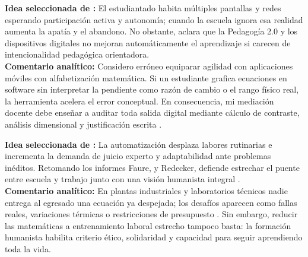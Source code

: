 \documentclass[spanish,letterpaper,oneside]{article}
\begin{document}
\begin{tcolorbox}[colback=iiiepeMint,colframe=iiiepeAqua!80!black,title=\textbf{Idea 2 · Nuevo aprendiz conectado, Pedagogía 2.0 y ciudadanía digital crítica},breakable]
\textbf{Idea seleccionada de \citet{scott2015futuro}:} El estudiantado habita múltiples pantallas y redes esperando participación activa y autonomía; cuando la escuela ignora esa realidad aumenta la apatía y el abandono. No obstante, \citet{scott2015futuro} aclara que la Pedagogía 2.0 y los dispositivos digitales no mejoran automáticamente el aprendizaje si carecen de intencionalidad pedagógica orientadora.\\[4pt]
\textbf{Comentario analítico:} Considero erróneo equiparar agilidad con aplicaciones móviles con alfabetización matemática. Si un estudiante grafica ecuaciones en software sin interpretar la pendiente como razón de cambio o el rango físico real, la herramienta acelera el error conceptual. En consecuencia, mi mediación docente debe enseñar a auditar toda salida digital mediante cálculo de contraste, análisis dimensional y justificación escrita \citep{sep2023pensamiento}.
\end{tcolorbox}

\begin{tcolorbox}[colback=iiiepeWarm,colframe=iiiepeOrange!90!black,title=\textbf{Idea 3 · Brecha escuela--trabajo, aprendizaje permanente y visión humanista},breakable]
\textbf{Idea seleccionada de \citet{scott2015futuro}:} La automatización desplaza labores rutinarias e incrementa la demanda de juicio experto y adaptabilidad ante problemas inéditos. Retomando los informes Faure, \citet{delors1996educacion} y Redecker, \citet{scott2015futuro} defiende estrechar el puente entre escuela y trabajo junto con una visión humanista integral \citep{unesco2015replantear}.\\[4pt]
\textbf{Comentario analítico:} En plantas industriales y laboratorios técnicos nadie entrega al egresado una ecuación ya despejada; los desafíos aparecen como fallas reales, variaciones térmicas o restricciones de presupuesto \citep{conalep2025mecatronica}. Sin embargo, reducir las matemáticas a entrenamiento laboral estrecho tampoco basta: la formación humanista habilita criterio ético, solidaridad y capacidad para seguir aprendiendo toda la vida.
\end{tcolorbox}
\end{document}
